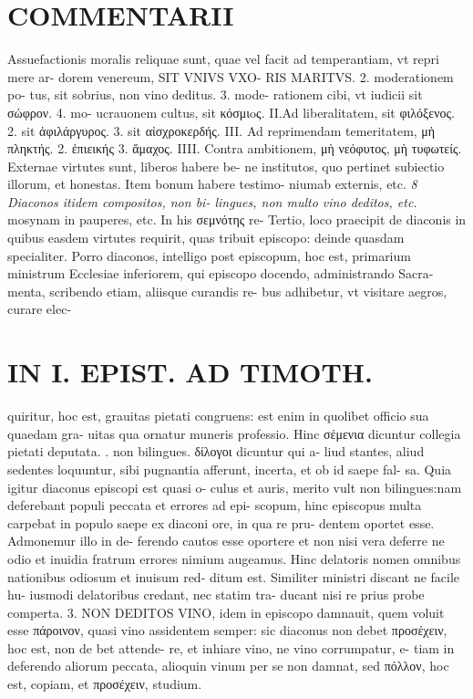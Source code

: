 \documentclass{article}
\begin{document}
\begin{pages}
\section*{COMMENTARII }
\marginpar{[ p.70 ]}\pstart Assuefactionis moralis reliquae sunt, quae vel facit ad temperantiam, vt repri mere ar- dorem venereum, SIT VNIVS VXO- RIS MARITVS. 2. moderationem po- tus, sit sobrius, non vino deditus. 3. mode- rationem cibi, vt iudicii sit σώφρον. 4. mo- ucrauonem cultus, sit κόσμιoς.  \pend\pstart II.Ad liberalitatem, sit φιλόξενος. 2. sit ἀφιλάργυρος. 3. sit αἰσχροκερδής.  \pend\pstart III. Ad reprimendam temeritatem, μἡ πληκτής. 2. ἐπιεικής 3. ἄμαχος.  \pend\pstart IIII. Contra ambitionem, μὴ νεόφυτος, μὴ τυφωτείς.  \pend\pstart Externae virtutes sunt, liberos habere be- ne institutos, quo pertinet subiectio illorum, et honestas. Item bonum habere testimo- niumab externis, etc.  \pend
\textit{8 Diaconos itidem compositos, non bi- lingues, non multo vino deditos, etc. }\pstart mosynam in pauperes, etc. In his σεμνότης re- Tertio, loco praecipit de diaconis in quibus easdem virtutes requirit, quas tribuit episcopo: deinde quasdam specialiter. Porro diaconos, intelligo post episcopum, hoc est, primarium ministrum Ecclesiae inferiorem, qui episcopo docendo, administrando Sacra- menta, scribendo etiam, aliisque curandis re- bus adhibetur, vt visitare aegros, curare elec-  \pend
\section*{IN I. EPIST. AD TIMOTH. }
\marginpar{[ p.75 ]}\pstart quiritur, hoc est, grauitas pietati congruens: est enim in quolibet officio sua quaedam gra- uitas qua ornatur muneris professio. Hinc σέμενια dicuntur collegia pietati deputata.  \pend{}. non bilingues. δίλογοι dicuntur qui a- liud stantes, aliud sedentes loquuntur, sibi pugnantia afferunt, incerta, et ob id saepe fal- sa. Quia igitur diaconus episcopi est quasi o- culus et auris, merito vult non bilingues:nam deferebant populi peccata et errores ad epi- scopum, hinc episcopus multa carpebat in populo saepe ex diaconi ore, in qua re pru- dentem oportet esse. Admonemur illo in de- ferendo cautos esse oportere et non nisi vera deferre ne odio et inuidia fratrum errores nimium augeamus. Hinc delatoris nomen omnibus nationibus odiosum et inuisum red- ditum est.  \pend\pstart Similiter ministri discant ne facile hu- iusmodi delatoribus credant, nec statim tra- ducant nisi re prius probe comperta. 3. NON DEDITOS VINO, idem in episcopo damnauit, quem voluit esse πάροινον, quasi vino assidentem semper: sic diaconus non debet προσέχειν, hoc est, non de bet attende- re, et inhiare vino, ne vino corrumpatur, e- tiam in deferendo aliorum peccata, alioquin vinum per se non damnat, sed πόλλον, hoc est, copiam, et προσέχειν, studium.  \pend

\end{pages}
\end{document}
